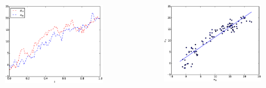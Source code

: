 \documentclass{beamer}
\begin{document}
\begin{frame}
\begin{columns}
\begin{column}{.45\linewidth}
\begin{figure}
\includegraphics[width=0.4\paperwidth]{img/spurious1}
\end{figure}
\end{column}
\begin{column}{.45\linewidth}
\begin{figure}
\includegraphics[width=0.4\paperwidth]{img/spurious2}
\end{figure}
\end{column}
\end{columns}
\end{frame}
\end{document}
